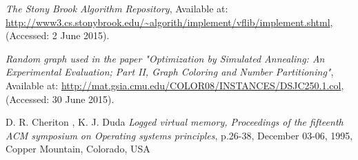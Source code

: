 \begin{thebibliography}{19}
	\emph{The Stony Brook Algorithm Repository},
	Available at: \url{http://www3.cs.stonybrook.edu/~algorith/implement/vflib/implement.shtml},
	(Accessed: 2 June 2015).	
		
	\emph{Random graph used in the paper
              "Optimization by Simulated Annealing: An
               Experimental Evaluation; Part II, Graph
               Coloring and Number Partitioning"},
	Available at: \url{http://mat.gsia.cmu.edu/COLOR08/INSTANCES/DSJC250.1.col},
	(Accessed: 30 June 2015).
	
	D. R. Cheriton , K. J. Duda
	\emph{Logged virtual memory, Proceedings of the fifteenth ACM symposium on Operating systems principles},
	 p.26-38, December 03-06, 1995, Copper Mountain, Colorado, USA 
\end{thebibliography}